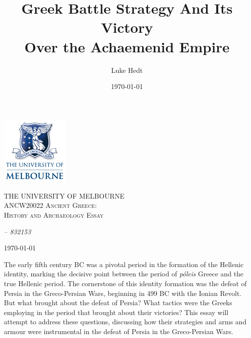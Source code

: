 \documentclass[twoside, a4paper, 12pt]{article}
\title{Greek Battle Strategy And Its Victory \\ Over the Achaemenid Empire}
\author{Luke Hedt}
\date{\today}
\begin{document}
\begin{titlepage}
    \centering
    \includegraphics[width=0.25\textwidth]{UniLogo.png}\par\vspace{1cm}
    {\scshape\Large THE UNIVERSITY OF MELBOURNE \\
              \large ANCW20022 Ancient Greece: \\
              History and Archaeology Essay\par}
    \vspace{1.5cm}
    {\Huge \thetitle \par}
    \vfill

    {\Large\itshape \theauthor \hspace{1em} -- \hspace{1em} 832153 \par}
    \vspace{1.5cm}
    {\Large \today}
\end{titlepage}
\pagestyle{plain}

The early fifth century BC was a pivotal period in the formation of the Hellenic
identity, marking the decisive point between the period of \emph{p{\'o}leis} Greece
and the true Hellenic period. The cornerstone of this identity formation
was the defeat of Persia in the Greco-Persian Wars, beginning in 499 BC
with the Ionian Revolt. But what brought about the defeat of Persia? What tactics
were the Greeks employing in the period that brought about their victories?
This essay will attempt to address these questions, discussing how their
strategies and arms and armour were instrumental in the defeat of Persia
in the Greco-Persian Wars.

\par\vspace{1em}
\end{document}
